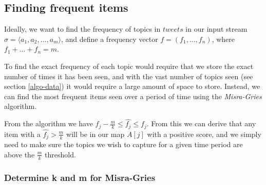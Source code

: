 \subsection{Finding frequent items}\label{algo-frequent}
Ideally, we want to find the frequency of topics in $tweets$ in our input stream $\sigma = \langle a_{1}, a_{2},...,a_{m}\rangle$, and define a frequency vector $f = (f_{1},...,f_{n})$, where $f_{1} + ... + f_{n} = m$. 

To find the exact frequency of each topic would require that we store the exact number of times it has been seen, and with the vast number of topics seen (see section \ref{algo-data}) it would require a large amount of space to store. Instead, we can find the most frequent items seen over a period of time using the \textit{Misra-Gries} algorithm.\cite{Amit}
\newline

From the algorithm we have $f_j - \frac{m}{k} \leq \hat{f_j} \leq f_j$. From this we can derive that any item with a $\hat{f_j} > \frac{m}{k}$ will be in our map $A[j]$ with a positive score, and we simply need to make sure the topics we wish to capture for a given time period are above the $\frac{m}{k}$ threshold.

\subsubsection{Determine k and m for Misra-Gries}
